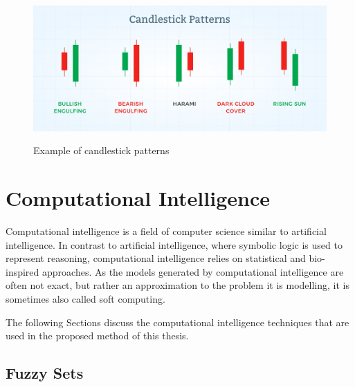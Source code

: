 \begin{figure}
\caption{Example of candlestick patterns}
\centering
\includegraphics[width=1.0\textwidth]{img/candlestick-patterns.png}
\label{figure:candlestick-patterns}
\end{figure}

\section{Computational Intelligence}
\label{section:computational-intelligence}

Computational intelligence is a field of computer science similar to artificial
intelligence. In contrast to artificial intelligence, where symbolic logic is
used to represent reasoning, computational intelligence relies on statistical
and bio-inspired approaches. As the models generated by computational
intelligence are often not exact, but rather an approximation to the problem it
is modelling, it is sometimes also called soft computing. %

The following Sections discuss the computational intelligence techniques that
are used in the proposed method of this thesis.


\subsection{Fuzzy Sets}
\label{subsection:fuzzy-sets}

